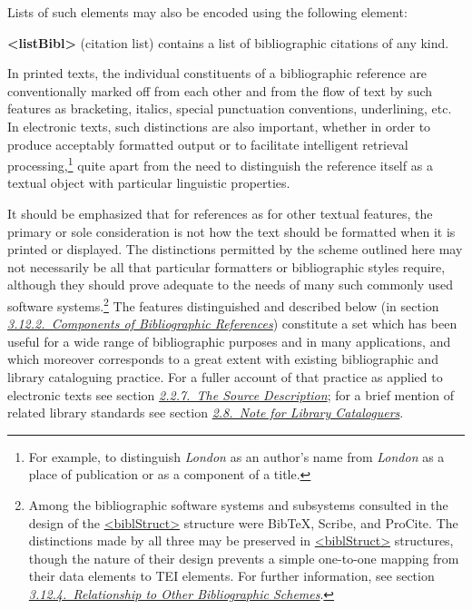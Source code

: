  Lists of such elements may also be encoded using the following element: 
\begin{sansreflist}
  
\item [\textbf{<listBibl>}] (citation list) contains a list of bibliographic citations of any kind.
\end{sansreflist}
\par
In printed texts, the individual constituents of a bibliographic reference are conventionally marked off from each other and from the flow of text by such features as bracketing, italics, special punctuation conventions, underlining, etc. In electronic texts, such distinctions are also important, whether in order to produce acceptably formatted output or to facilitate intelligent retrieval processing,\footnote{For example, to distinguish \textit{London} as an author's name from \textit{London} as a place of publication or as a component of a title.} quite apart from the need to distinguish the reference itself as a textual object with particular linguistic properties.\par
It should be emphasized that for references as for other textual features, the primary or sole consideration is not how the text should be formatted when it is printed or displayed. The distinctions permitted by the scheme outlined here may not necessarily be all that particular formatters or bibliographic styles require, although they should prove adequate to the needs of many such commonly used software systems.\footnote{Among the bibliographic software systems and subsystems consulted in the design of the \hyperref[TEI.biblStruct]{<biblStruct>} structure were BibTeX, Scribe, and ProCite. The distinctions made by all three may be preserved in \hyperref[TEI.biblStruct]{<biblStruct>} structures, though the nature of their design prevents a simple one-to-one mapping from their data elements to TEI elements. For further information, see section \textit{\hyperref[COBIOT]{3.12.4.\ Relationship to Other Bibliographic Schemes}}.} The features distinguished and described below (in section \textit{\hyperref[COBICO]{3.12.2.\ Components of Bibliographic References}}) constitute a set which has been useful for a wide range of bibliographic purposes and in many applications, and which moreover corresponds to a great extent with existing bibliographic and library cataloguing practice. For a fuller account of that practice as applied to electronic texts see section \textit{\hyperref[HD3]{2.2.7.\ The Source Description}}; for a brief mention of related library standards see section \textit{\hyperref[HD8]{2.8.\ Note for Library Cataloguers}}.\par
